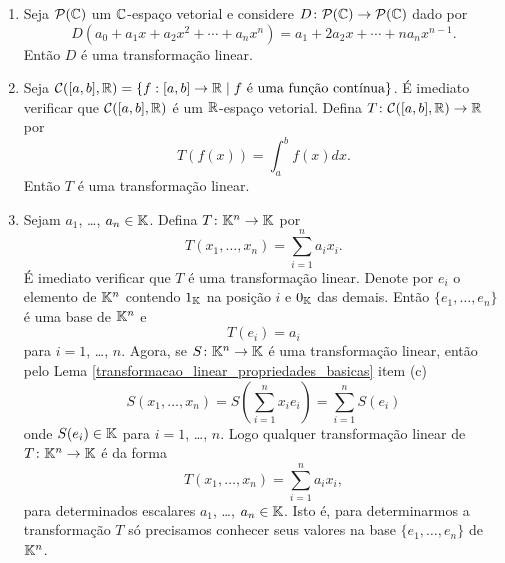 \begin{exemplo}
\begin{enumerate}[label={\arabic*})]
    \item Seja $\mathcal{P}(\mathbb{C})$ um $\mathbb{C}$-espa\c{c}o vetorial e considere $D \colon \mathcal{P}(\mathbb{C}) \to \mathcal{P}(\mathbb{C})$ dado por
    \[
      D(a_0 + a_1x + a_2x^2 + \cdots + a_nx^n) = a_1 + 2a_2x + \cdots + na_nx^{n-1}.
    \]
    Ent\~ao $D$ \'e uma transforma\c{c}\~ao linear.

    \item Seja $\mathcal{C}([a,b], \real) = \{ f : [a,b] \to \real \mid f \mbox{ \'e uma fun\c{c}\~ao cont{\'\i}nua}\}$. \'E imediato verificar que $\mathcal{C}([a,b], \mathbb{R})$ \'e um $\mathbb{R}$-espa\c{c}o vetorial. Defina $T \colon \mathcal{C}([a,b], \mathbb{R}) \to \mathbb{R}$ por
    \[
      T(f(x)) = \int_a^bf(x)dx.
    \]
    Ent\~ao $T$ \'e uma transforma\c{c}\~ao linear.

    \item Sejam $a_1$, \dots, $a_n \in \mathbb{K}$. Defina $T \colon \mathbb{K}^n \to \mathbb{K}$ por
    \[
      T(x_1, \dots, x_n) = \sum_{i=1}^na_ix_i.
    \]
    \'E imediato verificar que $T$ \'e uma transforma\c{c}\~ao linear. Denote por $e_i$ o elemento de $\mathbb{K}^n$ contendo $1_{\mathbb{K}}$ na posi\c{c}\~ao $i$ e $0_{\mathbb{K}}$ das demais. Ent\~ao $\{e_1, \dots, e_n\}$ \'e uma base de $\mathbb{K}^n$ e
    \[
      T(e_i) = a_i
    \]
    para $i = 1$, \dots, $n$. Agora, se $S \colon \mathbb{K}^n \to \mathbb{K}$ \'e uma transforma\c{c}\~ao linear, ent\~ao pelo Lema \ref{transformacao_linear_propriedades_basicas} item (c)
    \[
      S(x_1, \dots, x_n) = S(\sum_{i=1}^nx_ie_i) = \sum_{i=1}^nS(e_i)
    \]
    onde $S(e_i) \in \mathbb{K}$ para $i = 1$, \dots, $n$. Logo qualquer transforma\c{c}\~ao linear de $T \colon \mathbb{K}^n \to \mathbb{K}$ \'e da forma
    \[
      T(x_1, \dots, x_n) = \sum_{i=1}^na_ix_i,
    \]
    para determinados escalares $a_1$, \dots, $a_n \in \mathbb{K}$. Isto \'e, para determinarmos a transforma\c{c}\~ao $T$ s\'o precisamos conhecer seus valores na base $\{e_1, \dots, e_n\}$ de $\mathbb{K}^n$.
  \end{enumerate}
\end{exemplo}

